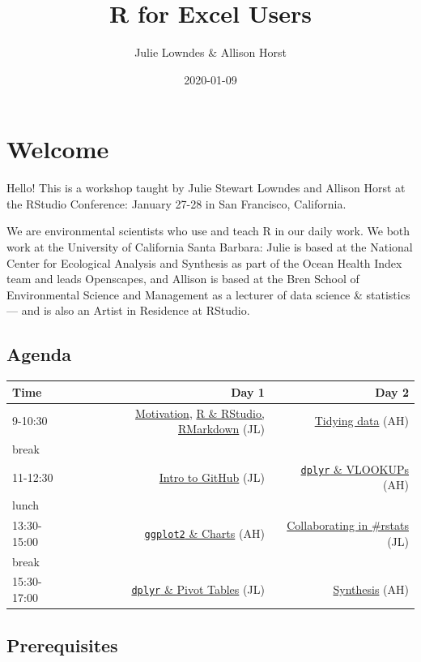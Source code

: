 \documentclass[]{book}
\title{R for Excel Users}
\author{Julie Lowndes \& Allison Horst}
\date{2020-01-09}
\begin{document}
\maketitle

{
\setcounter{tocdepth}{1}
\tableofcontents
}
\hypertarget{welcome}{%
\chapter{Welcome}\label{welcome}}

Hello! This is a workshop taught by Julie Stewart Lowndes and Allison Horst at the RStudio Conference: January 27-28 in San Francisco, California.

We are environmental scientists who use and teach R in our daily work. We both work at the University of California Santa Barbara: Julie is based at the National Center for Ecological Analysis and Synthesis as part of the Ocean Health Index team and leads Openscapes, and Allison is based at the Bren School of Environmental Science and Management as a lecturer of data science \& statistics --- and is also an Artist in Residence at RStudio.

\hypertarget{agenda}{%
\section{Agenda}\label{agenda}}

\begin{longtable}[]{@{}lrr@{}}
\toprule
Time & Day 1 & Day 2\tabularnewline
\midrule
\endhead
9-10:30 & \protect\hyperlink{overview}{Motivation}, \protect\hyperlink{rstudio}{R \& RStudio, RMarkdown} (JL) & \protect\hyperlink{tidying}{Tidying data} (AH)\tabularnewline
break & &\tabularnewline
11-12:30 & \protect\hyperlink{github}{Intro to GitHub} (JL) & \protect\hyperlink{dplyr-vlookups}{\texttt{dplyr} \& VLOOKUPs} (AH)\tabularnewline
lunch & &\tabularnewline
13:30-15:00 & \protect\hyperlink{ggplot2}{\texttt{ggplot2} \& Charts} (AH) & \protect\hyperlink{collaboration}{Collaborating in \#rstats} (JL)\tabularnewline
break & &\tabularnewline
15:30-17:00 & \protect\hyperlink{dplyr-pivot-tables}{\texttt{dplyr} \& Pivot Tables} (JL) & \protect\hyperlink{synthesis}{Synthesis} (AH)\tabularnewline
\bottomrule
\end{longtable}

\hypertarget{prerequisites}{%
\section{Prerequisites}\label{prerequisites}}
\end{document}
